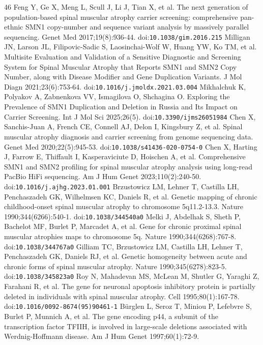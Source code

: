 \begin{thebibliography}{46}
 Feng Y, Ge X, Meng L, Scull J, Li J, Tian X, et al. The next generation of population-based spinal muscular atrophy carrier screening: comprehensive pan-ethnic SMN1 copy-number and sequence variant analysis by massively parallel sequencing. Genet Med 2017;19(8):936-44. doi:\nolinkurl{10.1038/gim.2016.215}
 Milligan JN, Larson JL, Filipovic-Sadic S, Laosinchai-Wolf W, Huang YW, Ko TM, et al. Multisite Evaluation and Validation of a Sensitive Diagnostic and Screening System for Spinal Muscular Atrophy that Reports SMN1 and SMN2 Copy Number, along with Disease Modifier and Gene Duplication Variants. J Mol Diagn 2021;23(6):753-64. doi:\nolinkurl{10.1016/j.jmoldx.2021.03.004}
 Mikhalchuk K, Polyakov A, Zabnenkova VV, Ismagilova O, Shchagina O. Exploring the Prevalence of SMN1 Duplication and Deletion in Russia and Its Impact on Carrier Screening. Int J Mol Sci 2025;26(5). doi:\nolinkurl{10.3390/ijms26051984}
 Chen X, Sanchis-Juan A, French CE, Connell AJ, Delon I, Kingsbury Z, et al. Spinal muscular atrophy diagnosis and carrier screening from genome sequencing data. Genet Med 2020;22(5):945-53. doi:\nolinkurl{10.1038/s41436-020-0754-0}
 Chen X, Harting J, Farrow E, Thiffault I, Kasperaviciute D, Hoischen A, et al. Comprehensive SMN1 and SMN2 profiling for spinal muscular atrophy analysis using long-read PacBio HiFi sequencing. Am J Hum Genet 2023;110(2):240-50. doi:\nolinkurl{10.1016/j.ajhg.2023.01.001}
 Brzustowicz LM, Lehner T, Castilla LH, Penchaszadeh GK, Wilhelmsen KC, Daniels R, et al. Genetic mapping of chronic childhood-onset spinal muscular atrophy to chromosome 5q11.2-13.3. Nature 1990;344(6266):540-1. doi:\nolinkurl{10.1038/344540a0}
 Melki J, Abdelhak S, Sheth P, Bachelot MF, Burlet P, Marcadet A, et al. Gene for chronic proximal spinal muscular atrophies maps to chromosome 5q. Nature 1990;344(6268):767-8. doi:\nolinkurl{10.1038/344767a0}
 Gilliam TC, Brzustowicz LM, Castilla LH, Lehner T, Penchaszadeh GK, Daniels RJ, et al. Genetic homogeneity between acute and chronic forms of spinal muscular atrophy. Nature 1990;345(6278):823-5. doi:\nolinkurl{10.1038/345823a0}
 Roy N, Mahadevan MS, McLean M, Shutler G, Yaraghi Z, Farahani R, et al. The gene for neuronal apoptosis inhibitory protein is partially deleted in individuals with spinal muscular atrophy. Cell 1995;80(1):167-78. doi:\nolinkurl{10.1016/0092-8674(95)90461-1}
 Bürglen L, Seroz T, Miniou P, Lefebvre S, Burlet P, Munnich A, et al. The gene encoding p44, a subunit of the transcription factor TFIIH, is involved in large-scale deletions associated with Werdnig-Hoffmann disease. Am J Hum Genet 1997;60(1):72-9.

\end{thebibliography}
